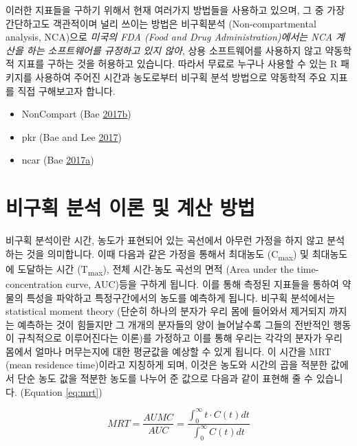\documentclass[12pt,]{krantz}
\providecommand{\tightlist}{%
  \setlength{\itemsep}{0pt}\setlength{\parskip}{0pt}}
\theoremstyle{definition}
\theoremstyle{definition}
\theoremstyle{definition}
\theoremstyle{remark}
\begin{document}
이러한 지표들을 구하기 위해서 현재 여러가지 방법들을 사용하고 있으며, 그
중 가장 간단하고도 객관적이며 널리 쓰이는 방법은 비구획분석
(Non-compartmental analysis, NCA)으로 \emph{미국의 FDA (Food and Drug
Administration)에서는 NCA 계산을 하는 소프트웨어를 규정하고 있지 않아},
상용 소프트웨어를 사용하지 않고 약동학적 지표를 구하는 것을 허용하고
있습니다. 따라서 무료로 누구나 사용할 수 있는 R 패키지를 사용하여 주어진
시간과 농도로부터 비구획 분석 방법으로 약동학적 주요 지표를 직접
구해보고자 합니다.

\begin{itemize}
\tightlist
\item
  NonCompart (Bae
  \protect\hyperlink{ref-R-NonCompart}{2017}\protect\hyperlink{ref-R-NonCompart}{b})
\item
  pkr (Bae and Lee \protect\hyperlink{ref-R-pkr}{2017})
\item
  ncar (Bae
  \protect\hyperlink{ref-R-ncar}{2017}\protect\hyperlink{ref-R-ncar}{a})
\end{itemize}

\section{비구획 분석 이론 및 계산 방법}\label{ncar-method}

비구획 분석이란 시간, 농도가 표현되어 있는 곡선에서 아무런 가정을 하지
않고 분석하는 것을 의미합니다. 이때 다음과 같은 가정을 통해서 최대농도
(C\textsubscript{max}) 및 최대농도에 도달하는 시간
(T\textsubscript{max}), 전체 시간-농도 곡선의 면적 (Area under the
time-concentration curve, AUC)등을 구하게 됩니다. 이를 통해 측정된
지표들을 통하여 약물의 특성을 파악하고 특정구간에서의 농도를 예측하게
됩니다. 비구획 분석에서는 statistical moment theory (단순히 하나의
분자가 우리 몸에 들어와서 제거되지 까지는 예측하는 것이 힘들지만 그
개개의 분자들의 양이 늘어날수록 그들의 전반적인 행동이 규칙적으로
이루어진다는 이론)를 가정하고 이를 통해 우리는 각각의 분자가 우리 몸에서
얼마나 머무는지에 대한 평균값을 예상할 수 있게 됩니다. 이 시간을 MRT
(mean residence time)이라고 지칭하게 되며, 이것은 농도와 시간의 곱을
적분한 값에서 단순 농도 값을 적분한 농도를 나누어 준 값으로 다음과 같이
표현해 줄 수 있습니다. (Equation \eqref{eq:mrt})

\[
\begin{equation}
  MRT = \frac{AUMC}{AUC} = \frac{\int_{0}^{\infty} t \cdot C(t) dt}{\int_{0}^{\infty} C(t) dt}
  \label{eq:mrt}
\end{equation}
\]
\end{document}
